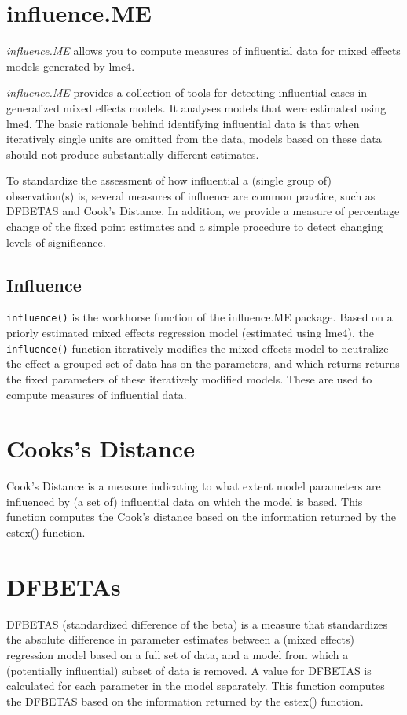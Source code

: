 \documentclass[Main.tex]{subfiles}
\begin{document}
\section{influence.ME}

\textit{influence.ME} allows you to compute measures of influential data for mixed effects models generated by lme4.

\textit{influence.ME} provides a collection of tools for detecting influential cases in generalized mixed effects models. It analyses models that were estimated using lme4. The basic rationale behind identifying influential data is that when iteratively single units are omitted from the data, models based on these data should not produce substantially different estimates. 

To standardize the assessment of how influential a (single group of) observation(s) is, several measures of influence are common practice, such as DFBETAS and Cook's Distance. In addition, we provide a measure of percentage change of the fixed point estimates and a simple procedure to detect changing levels of significance.

\subsection{Influence}
\texttt{influence()} is the workhorse function of the influence.ME package. Based on a priorly estimated mixed effects regression model (estimated using lme4), the \texttt{influence()} function iteratively modifies the mixed effects model to neutralize the effect a grouped set of data has on the parameters, and which returns returns the fixed parameters of these iteratively modified models. These are used to compute measures of influential data.
\section{Cooks's Distance}
Cook's Distance is a measure indicating to what extent model parameters are influenced by (a set of) influential data on which the model is based. This function computes the Cook's distance based on the information returned by the estex() function.
\section{DFBETAs}
DFBETAS (standardized difference of the beta) is a measure that standardizes the absolute difference in parameter estimates between a (mixed effects) regression model based on a full set of data, and a model from which a (potentially influential) subset of data is removed. A value for DFBETAS is calculated for each parameter in the model separately. This function computes the DFBETAS based on the information returned by the estex() function.
\end{document}
